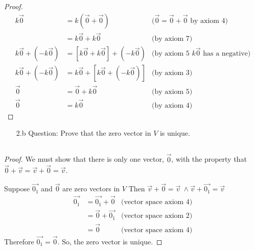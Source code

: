 \documentclass[11pt]{article}
\begin{document}
\subsection[Proof: $k\vec{0} = \vec{0}$]{}
\begin{proof}
        \begin{align*}
                k\vec{0}             & = k(\vec{0} + \vec{0})                & \textrm{($\vec{0} = \vec{0}+\vec{0}$ by axiom 4)} \\
                                     & = k\vec{0} + k\vec{0}                 & \textrm{(by axiom 7)}                             \\
                k\vec{0}+(-k\vec{0}) & = [k\vec{0} + k\vec{0}] + (-k\vec{0}) & \textrm{(by axiom 5 $k\vec{0}$ has a negative)}   \\
                k\vec{0}+(-k\vec{0}) & = k\vec{0} + [k\vec{0} + (-k\vec{0})] & \textrm{(by axiom 3)}                             \\
                \vec{0}              & = \vec{0} + k\vec{0}                  & \textrm{(by axiom 5)}                             \\
                \vec{0}              & = k\vec{0}                            & \textrm{(by axiom 4)}
        \end{align*}
\end{proof}
\begin{enumerate}
        \item[2.b]Question: Prove that the zero vector in $V$ is unique.
\end{enumerate}
\subsection[Proof: the zero vector in $V$ is unique]{}
\begin{proof}
        We must show that there is only one vector, $\vec{0}$, with the property that \\
        $\vec{0} + \vec{v} = \vec{v} + \vec{0} = \vec{v}$.

        Suppose $\vec{0_1}$ and $\vec{0}$ are zero vectors in $V$ Then $\vec{v} + \vec{0} = \vec{v}\ \land \vec{v} + \vec{0_1} = \vec{v}$
        \begin{align*}
                \vec{0_1} & = \vec{0_1} + \vec{0} & \textrm{(vector space axiom 4)} \\
                          & = \vec{0} + \vec{0_1} & \textrm{(vector space axiom 2)} \\
                          & = \vec{0}             & \textrm{(vector space axiom 4)}
        \end{align*}
        Therefore $\vec{0_1} = \vec{0}$. So, the zero vector is unique.
\end{proof}
\pagebreak
\end{document}

